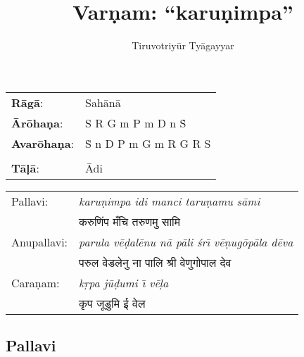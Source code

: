 \documentclass[12pt]{article}
\title{Var\d{n}am: ``karu\d nimpa''}
\author{Tiruvotriy\=ur Ty\=agayyar}
\date{}                                           %
\def \deva#1{{\fontspec{DevanagariMT}#1}}
\begin{document}
\maketitle
\begin{tabular}{ll}
\textbf{R\=ag\=a}: & Sah\=an\=a \\
\textbf{\=Ar\=oha\d na}: & S R G m P m D n \.S \\
\textbf{Avar\=oha\d na}: & \.S n D P m G m R G R S \\\\
\textbf{T\=a\d l\=a}: & \=Adi
\end{tabular}

\vspace{0.25 in}

\begin{tabular}{ll}
Pallavi: & \emph{karu\d nimpa idi manci taru\d namu s\=ami} \\
& \deva{करुणिंप मँचि तरुणमु सामि}\\
Anupallavi: & \emph{parula v\=e\d{d}al\=enu n\=a p\=ali \'sr\=\i{} v\=e\d{n}ug\=op\=ala d\=eva} \\
&  \deva{परुल वेडलेनु ना पालि श्री वेणुगोपाल देव}\\
Cara\d nam: & \emph{k\d rpa j\=u\d dumi \=\i{} v\=e\d{l}a}\\
&  \deva{कृप जूडुमि ई वेल}
\end{tabular}

\def \speed{0.276in}
\def \f#1{\makebox[0.069in][l]{#1}}
\def \t#1{\makebox[0.138in][l]{#1}}
\def \s#1{\makebox[\speed][l]{#1}}

\def \four#1{#1\s{}}
\def \Four#1[#2]{#1#2}
\def \Sl {\s{\d{S}}}
\def \rl {\s{\d{r}}}
\def \Rl {\s{\d{R}}}
\def \gl {\s{\d{g}}}
\def \Gl {\s{\d{G}}}
\def \ml {\s{\d{m}}}
\def \Ml {\s{\d{M}}}
\def \Pl {\s{\d{P}}}
\def \dal {\s{\d{d}}}
\def \Dl {\s{\d{D}}}
\def \nl {\s{\d{n}}}
\def \Nl {\s{\d{N}}}
\def \S {\s{S}}
\def \r {\s{r}}
\def \R {\s{R}}
\def \g {\s{g}}
\def \G {\s{G}}
\def \m {\s{m}}
\def \M {\s{M}}
\def \P {\s{P}}
\def \da {\s{d}}
\def \D {\s{D}}
\def \n {\s{n}}
\def \N {\s{N}}
\def \Su {\s{\.S}}
\def \ru {\s{\.r}}
\def \Ru {\s{\.R}}
\def \gu {\s{\.g}}
\def \Gu {\s{\.G}}
\def \mu {\s{\.m}}
\def \Mu {\s{\.M}}
\def \Pu {\s{\.P}}
\def \dau {\s{\.d}}
\def \Du {\s{\.D}}
\def \nu {\s{\.n}}
\def \Nu {\s{\.N}}
\def \p {\s{,}}

\def \lagu {\s{$||$}}
\def \dhru {\s{$|$}}

\subsection*{Pallavi}
\end{document}
